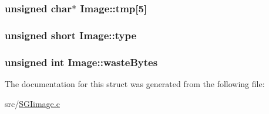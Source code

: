 \subsubsection[{tmp}]{\setlength{\rightskip}{0pt plus 5cm}unsigned char$\ast$ Image\+::tmp\mbox{[}5\mbox{]}}\label{structImage_a9baf3bb52b5842bf2ff76ece5a5339a5}
\hypertarget{structImage_a1a32131c2efbb278f0e5f0b554e171b1}{}
\subsubsection[{type}]{\setlength{\rightskip}{0pt plus 5cm}unsigned short Image\+::type}\label{structImage_a1a32131c2efbb278f0e5f0b554e171b1}
\hypertarget{structImage_a767d0814412c848df245e3fd6f4bcc11}{}
\subsubsection[{waste\+Bytes}]{\setlength{\rightskip}{0pt plus 5cm}unsigned int Image\+::waste\+Bytes}\label{structImage_a767d0814412c848df245e3fd6f4bcc11}


The documentation for this struct was generated from the following file\+:\begin{DoxyCompactItemize}
\item 
src/\hyperlink{SGIimage_8c}{S\+G\+Iimage.\+c}\end{DoxyCompactItemize}

